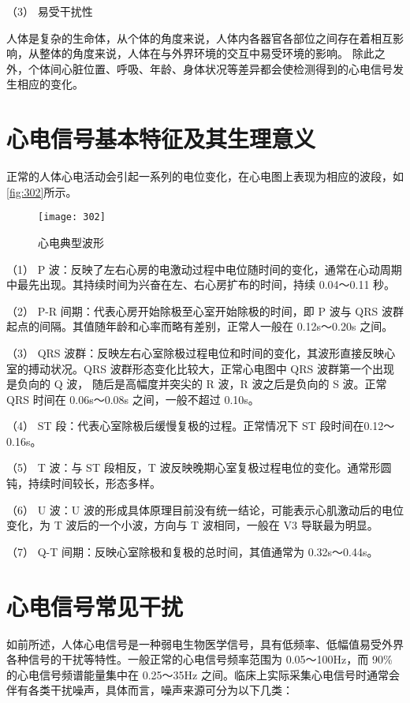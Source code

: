 （3）	易受干扰性 

人体是复杂的生命体，从个体的角度来说，人体内各器官各部位之间存在着相互影响，从整体的角度来说，人体在与外界环境的交互中易受环境的影响。
除此之外，个体间心脏位置、呼吸、年龄、身体状况等差异都会使检测得到的心电信号发生相应的变化。 

\section{心电信号基本特征及其生理意义}
正常的人体心电活动会引起一系列的电位变化，在心电图上表现为相应的波段，如\autoref{fig:302}所示\cite{9}。 
\begin{figure}[htbp]
    \centering
    \texttt{[image: 302]}
    \caption{\label{fig:302}心电典型波形}
\end{figure}

（1）	P 波：反映了左右心房的电激动过程中电位随时间的变化，通常在心动周期中最先出现。其持续时间为兴奋在左、右心房扩布的时间，持续 0.04～0.11 秒。 

（2）	P-R 间期：代表心房开始除极至心室开始除极的时间，即 P 波与 QRS 波群起点的间隔。其值随年龄和心率而略有差别，正常人一般在 0.12s～0.20s 之间。 

（3）	QRS 波群：反映左右心室除极过程电位和时间的变化，其波形直接反映心室的搏动状况。QRS 波群形态变化比较大，正常心电图中 QRS 波群第一个出现是负向的 Q 波，
随后是高幅度并突尖的 R 波，R 波之后是负向的 S 波。正常 QRS 时间在 0.06s～0.08s 之间，一般不超过 0.10s。 

（4）	ST 段：代表心室除极后缓慢复极的过程。正常情况下 ST 段时间在0.12～0.16s。 

（5）	T 波：与 ST 段相反，T 波反映晚期心室复极过程电位的变化。通常形圆钝，持续时间较长，形态多样。 

（6）	U 波：U 波的形成具体原理目前没有统一结论，可能表示心肌激动后的电位变化，为 T 波后的一个小波，方向与 T 波相同，一般在 V3 导联最为明显。 

（7）	Q-T 间期：反映心室除极和复极的总时间，其值通常为 0.32s～0.44s。 

\section{心电信号常见干扰}

如前所述，人体心电信号是一种弱电生物医学信号，具有低频率、低幅值易受外界各种信号的干扰等特性。一般正常的心电信号频率范围为 0.05～100Hz，而 90\%
的心电信号频谱能量集中在 0.25～35Hz 之间。临床上实际采集心电信号时通常会伴有各类干扰噪声，具体而言，噪声来源可分为以下几类： 


